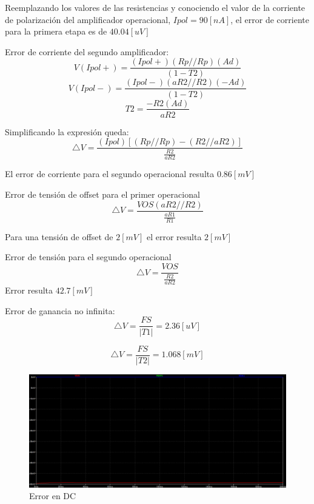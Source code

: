 \documentclass[12pt]{article}
\begin{document}
	Reemplazando los valores de las resistencias y conociendo el valor de la corriente de polarización del amplificador operacional, $Ipol=90[nA]$, el error de corriente para la primera etapa es de $40.04[uV]$
	
	Error de corriente del segundo amplificador:
	\begin{equation}
		V(Ipol+)=\frac{(Ipol+)(Rp//Rp)(Ad)}{(1-T2)}
	\end{equation}
	\begin{equation}
		V(Ipol-)=\frac{(Ipol-)(aR2//R2)(-Ad)}{(1-T2)}
	\end{equation}
	\begin{equation}
		T2=\frac{-R2(Ad)}{aR2}
	\end{equation}
	
	Simplificando la expresión queda:
	\begin{equation}
		\bigtriangleup V= \frac{(Ipol)[(Rp//Rp)-(R2//aR2)]}{\frac{R2}{aR2}}
	\end{equation}
	
	El error de corriente para el segundo operacional resulta $0.86[mV]$
	
	Error de tensión de offset para el primer operacional
	\begin{equation}
		\bigtriangleup V = \frac{VOS(aR2//R2)}{\frac{aR1}{R1}}
	\end{equation}
	
	Para una tensión de offset de  $2[mV]$  el error resulta $2[mV]$
	
	Error de tensión para el segundo operacional
	\begin{equation}
		\bigtriangleup V=\frac{VOS}{\frac{R2}{aR2}}
	\end{equation}
	Error resulta $42.7[mV]$
	
	Error de ganancia no infinita:
	\begin{equation}
		\bigtriangleup V = \frac{FS}{|T1|}=2.36[uV]
	\end{equation}
	
		\begin{equation}
		\bigtriangleup V = \frac{FS}{|T2|}=1.068[mV]
	\end{equation}
	
	\begin{figure}[b!]
		\includegraphics[width=\linewidth]{Imagenes_simulaciones/Sim_Error_DC_C2}
		\caption[Error en DC]{Error en DC}
		\label{fig:simerrordcc2}
	\end{figure}
	
\end{document}
